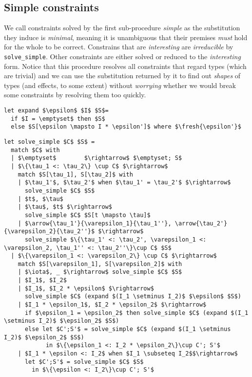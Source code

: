 \documentclass[declaration,shortabstract]{iithesis}
\theoremstyle{definition} \newtheorem{definition}{Definition}[section]
\newcommand{\arrow}[3]{{#1}\rightarrow_{#2}{#3}}
\newcommand{\fresh}[1]{\ensuremath{\operatorname{fresh}({#1})}}
\begin{document}
\subsection{Simple constraints}
We call constraints solved by the first sub-procedure \textit{simple} as the substitution they induce is \textit{minimal},
meaning it is unambiguous that their premises \textit{must} hold for the whole to be correct. Constrains that are \textit{interesting} are \textit{irreducible} by \texttt{solve\_simple}.
Other constraints are either solved or reduced to the \textit{interesting} form.
Notice that this procedure resolves all constraints that regard types (which are trivial)
and we can use the substitution returned by it
to find out \textit{shapes} of types (and effects, to some extent) without \textit{worrying} whether we would break
some constraints by resolving them too quickly.

\begin{lstlisting}
let expand $\epsilon$ $I$ $S$= 
  if $I = \emptyset$ then $S$
  else $S[\epsilon \mapsto I * \epsilon']$ where $\fresh{\epsilon'}$
\end{lstlisting}
\begin{lstlisting}
let solve_simple $C$ $S$ = 
  match $C$ with
  | $\emptyset$        $\rightarrow$ $\emptyset; S$
  | $\{\tau_1 <: \tau_2\} \cup C$ $\rightarrow$
    match $S[\tau_1], S[\tau_2]$ with
    | $\tau_1'$, $\tau_2'$ when $\tau_1' = \tau_2'$ $\rightarrow$
      solve_simple $C$ $S$
    | $t$, $\tau$
    | $\tau$, $t$ $\rightarrow$
      solve_simple $C$ $S[t \mapsto \tau]$
    | $\arrow{\tau_1'}{\varepsilon_1}{\tau_1''}, \arrow{\tau_2'}{\varepsilon_2}{\tau_2''}$ $\rightarrow$
      solve_simple $\{\tau_1' <: \tau_2', \varepsilon_1 <: \varepsilon_2, \tau_1'' <: \tau_2''\}\cup C$ $S$
  | $\{\varepsilon_1 <: \varepsilon_2\} \cup C$ $\rightarrow$
    match $S[\varepsilon_1], S[\varepsilon_2]$ with
    | $\iota$, _ $\rightarrow$ solve_simple $C$ $S$
    | $I_1$, $I_2$ 
    | $I_1$, $I_2 * \epsilon$ $\rightarrow$
      solve_simple $C$ (expand $(I_1 \setminus I_2)$ $\epsilon$ $S$)
    | $I_1 * \epsilon_1$, $I_2 * \epsilon_2$ $\rightarrow$
      if $\epsilon_1 = \epsilon_2$ then solve_simple $C$ (expand $(I_1 \setminus I_2)$ $\epsilon_2$ $S$)
      else let $C';S'$ = solve_simple $C$ (expand $(I_1 \setminus I_2)$ $\epsilon_2$ $S$) 
            in $\{\epsilon_1 <: I_2 * \epsilon_2\}\cup C'; S'$
    | $I_1 * \epsilon <: I_2$ when $I_1 \subseteq I_2$$\rightarrow$
      let $C';S'$ = solve_simple $C$ $S$ 
        in $\{\epsilon <: I_2\}\cup C'; S'$
\end{lstlisting}
\end{document}
